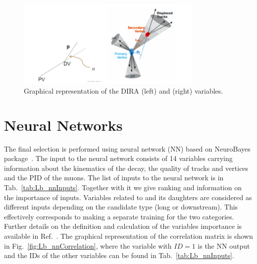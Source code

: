 \begin{figure}[hbt]
\centering
\includegraphics[width=0.8\textwidth]{Lmumu/figs/IPandDIRA.png}
\caption{Graphical representation of the DIRA (left) and \chisqip (right) variables.}
\label{fig:IPandDIRA}
\end{figure}


\section{Neural Networks}
\label{sec:Lb_mva}

The final selection is performed using neural network (NN) based on NeuroBayes package~\cite{Feindt:2006pm,feindt-2004}.
The input to the neural network consists of 14 variables carrying information about the kinematics of the decay,
the quality of tracks and vertices and the PID of the muons.
The list of inputs to the neural network is in Tab.~\ref{tab:Lb_nnInputs}. Together with it we give
ranking and information on the importance of inputs.
%
%
%
Variables related to \Lz and its daughters are considered as different inputs depending on the
candidate type (long or downstream). This effectively corresponds to making a separate
training for the two categories. Further details on the definition and calculation of the
variables importance is available in Ref.~\cite{LHCb-ANA-2011-094}.
The graphical representation of the correlation matrix is shown in Fig.~\ref{fig:Lb_nnCorrelation},
where the variable with $ID = 1$ is the NN output and the IDs of the other variables can be found
in Tab.~\ref{tab:Lb_nnInputs}.

